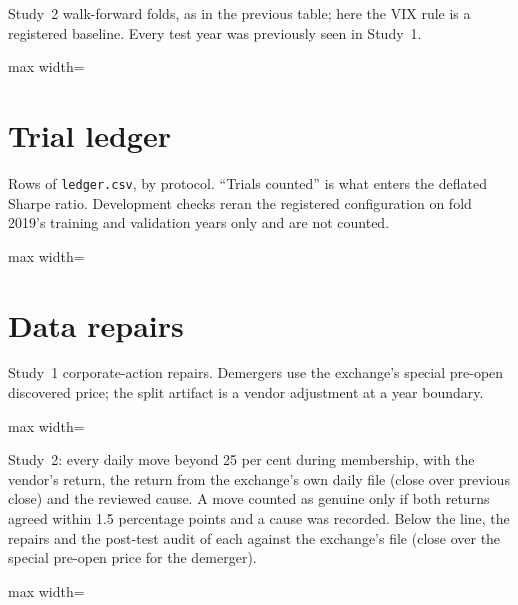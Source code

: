 \documentclass[11pt]{article}
\newcommand{\gtab}[1]{\begin{adjustbox}{max width=\linewidth}\end{adjustbox}}
\begin{document}
\begin{table}[H]
\centering\small
\caption{Study~2 walk-forward folds, as in the previous table; here the VIX rule is a registered baseline. Every test year was previously seen in Study~1.}
\gtab{tab_n50_folds.tex}
\end{table}

\section{Trial ledger}\label{app:ledger}

\begin{table}[H]
\centering\small
\caption{Rows of \texttt{ledger.csv}, by protocol. ``Trials counted'' is what enters the deflated Sharpe ratio. Development checks reran the registered configuration on fold 2019's training and validation years only and are not counted.}
\gtab{tab_ledger.tex}
\end{table}

\section{Data repairs}\label{app:data}

\begin{table}[H]
\centering\small
\caption{Study~1 corporate-action repairs. Demergers use the exchange's special pre-open discovered price; the split artifact is a vendor adjustment at a year boundary.}
\gtab{tab_repairs.tex}
\end{table}

\begin{table}[H]
\centering\small
\caption{Study~2: every daily move beyond 25 per cent during membership, with the vendor's return, the return from the exchange's own daily file (close over previous close) and the reviewed cause. A move counted as genuine only if both returns agreed within 1.5 percentage points and a cause was recorded. Below the line, the \NxRepairs{} repairs and the post-test audit of each against the exchange's file (close over the special pre-open price for the demerger).}
\gtab{tab_n50_moves.tex}
\end{table}
\end{document}
